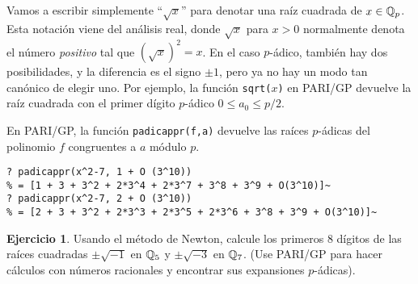 \documentclass{article}
\numberwithin{equation}{section}
\theoremstyle{definition}
\newtheorem{ejerc}{Ejercicio}
\begin{document}
Vamos a escribir simplemente ``$\sqrt{x}$'' para denotar una raíz cuadrada de
$x\in\mathbb{Q}_p$. Esta notación viene del análisis real, donde $\sqrt{x}$ para
$x > 0$ normalmente denota el número \emph{positivo} tal que
$(\sqrt{x})^2 = x$. En el caso $p$-ádico, también hay dos posibilidades,
y la diferencia es el signo $\pm 1$, pero ya no hay un modo tan canónico de
elegir uno. Por ejemplo, la función \texttt{sqrt($x$)} en PARI/GP devuelve la
raíz cuadrada con el primer dígito $p$-ádico $0 \le a_0 \le p/2$.

\begin{framed}
  \noindent En PARI/GP, la función \verb|padicappr(f,a)| devuelve las raíces
  $p$-ádicas del polinomio $f$ congruentes a $a$ módulo $p$.

  {\small
\begin{verbatim}
? padicappr(x^2-7, 1 + O (3^10))
% = [1 + 3 + 3^2 + 2*3^4 + 2*3^7 + 3^8 + 3^9 + O(3^10)]~
? padicappr(x^2-7, 2 + O (3^10))
% = [2 + 3 + 3^2 + 2*3^3 + 2*3^5 + 2*3^6 + 3^8 + 3^9 + O(3^10)]~
\end{verbatim}}
\end{framed}

\begin{ejerc}
  Usando el método de Newton, calcule los primeros $8$ dígitos de las raíces
  cuadradas $\pm\sqrt{-1}$ en $\mathbb{Q}_5$ y $\pm\sqrt{-3}$ en $\mathbb{Q}_7$.
  (Use PARI/GP para hacer cálculos con números racionales y encontrar sus
  expansiones $p$-ádicas).
\end{ejerc}
\end{document}
